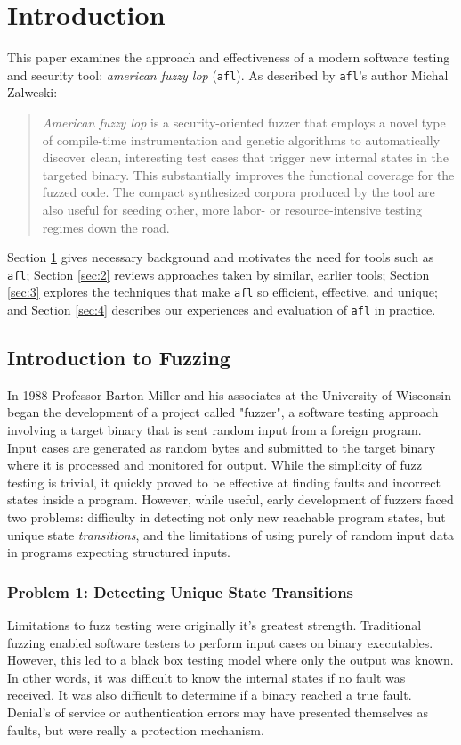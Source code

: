 \chapter{Introduction}
\label{sec:1}

This paper examines the approach and effectiveness of a modern
software testing and security tool: \textit{american fuzzy lop}\cite{afl-main} (\texttt{afl}).
As described by \texttt{afl}'s author Michal Zalweski\cite{afl-main}:
\begin{quote}
\textit{American fuzzy lop} is a security-oriented fuzzer that employs a novel type of compile-time instrumentation and genetic algorithms to automatically discover clean, interesting test cases that trigger new internal states in the targeted binary. This substantially improves the functional coverage for the fuzzed code. The compact synthesized corpora produced by the tool are also useful for seeding other, more labor- or resource-intensive testing regimes down the road. 
\end{quote}

Section \ref{sec:1} gives necessary background and motivates the need for
tools such as \texttt{afl}; Section \ref{sec:2} reviews approaches taken by similar,
earlier tools; Section \ref{sec:3} explores the techniques that make
\texttt{afl} so efficient, effective, and unique; and Section \ref{sec:4}
describes our experiences and evaluation of \texttt{afl} in practice.

\section{Introduction to Fuzzing}

In 1988 Professor Barton Miller and his associates at the University of Wisconsin began the development of a project called "fuzzer"\cite{mil-fuzz}, a software testing approach involving a target binary that is sent random input from a foreign program.
 Input cases are generated as random bytes and submitted to the target binary where it is processed and monitored for output. While the simplicity of fuzz testing is trivial, it quickly proved to be effective at finding faults and incorrect states inside a program. 
However, while useful, early development of fuzzers faced two problems: difficulty in detecting not only new reachable program states, but  unique state \textit{transitions}, and the limitations of using purely of random input data in programs expecting structured inputs.

\subsection{Problem 1: Detecting Unique State Transitions}
Limitations to fuzz testing were originally it's greatest strength. Traditional fuzzing enabled software testers to perform input cases on binary executables. 
However, this led to a black box testing model where only the output was known.  In other words, it was difficult to know the internal states if no fault was received. It was also difficult to determine
if a binary reached a true fault. Denial's of service or authentication errors may have presented themselves as faults, but were really a protection mechanism.

